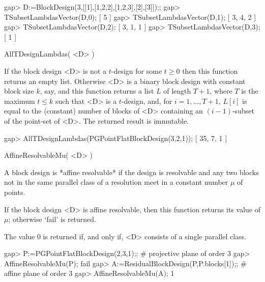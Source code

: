 \beginexample
gap> D:=BlockDesign(3,[[1],[1,2,2],[1,2,3],[2],[3]]);;
gap> TSubsetLambdasVector(D,0);
[ 5 ]
gap> TSubsetLambdasVector(D,1);
[ 3, 4, 2 ]
gap> TSubsetLambdasVector(D,2);
[ 3, 1, 1 ]
gap> TSubsetLambdasVector(D,3);
[ 1 ]
\endexample



\>AllTDesignLambdas( <D> )

If the block design <D> is not a $t$-design for some $t\ge 0$ then this
function returns an empty list. Otherwise <D> is a binary block design
with constant block size $k$, say, and this function returns a list
$L$ of length $T+1$, where $T$ is the maximum $t\le k$ such that <D>
is a $t$-design, and, for $i=1,\ldots,T+1$, $L[i]$ is equal to the
(constant) number of blocks of <D> containing an $(i-1)$-subset of
the point-set of <D>. The returned result is immutable.

\beginexample
gap> AllTDesignLambdas(PGPointFlatBlockDesign(3,2,1));                  
[ 35, 7, 1 ]
\endexample



\>AffineResolvableMu( <D> )

A block design is *affine resolvable* if the design is resolvable 
and any two blocks not in the same parallel class of a resolution 
meet in a constant number $\mu$ of points. 

If the block design <D> is affine resolvable, then this function
returns its value of $\mu$; otherwise `fail' is returned.
 
The value 0 is returned if, and only if, <D> consists of a single
parallel class.

\beginexample
gap> P:=PGPointFlatBlockDesign(2,3,1);; # projective plane of order 3 
gap> AffineResolvableMu(P);
fail
gap> A:=ResidualBlockDesign(P,P.blocks[1]);; # affine plane of order 3
gap> AffineResolvableMu(A);                                           
1
\endexample

